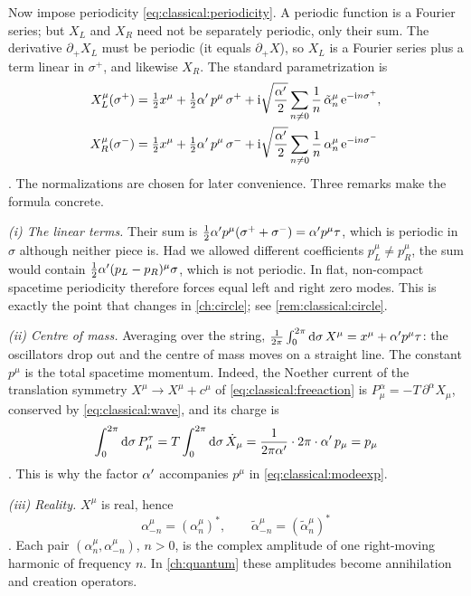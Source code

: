 Now impose periodicity \eqref{eq:classical:periodicity}. A periodic function is a Fourier
series; but $X_L$ and $X_R$ need not be separately periodic, only their sum. The derivative
$\partial_+X_L$ must be periodic (it equals $\partial_+X$), so $X_L$ is a Fourier series plus
a term linear in $\sigma^+$, and likewise $X_R$. The standard parametrization is
\begin{align}
  X_L^\mu(\sigma^+)&=\tfrac12x^\mu+\tfrac12\alpha'\,p^\mu\,\sigma^+
     +\mathrm{i}\sqrt{\frac{\alpha'}{2}}\sum_{n\neq0}\frac1n\,\tilde\alpha_n^\mu\,\mathrm{e}^{-\mathrm{i} n\sigma^+},\nonumber\\
  X_R^\mu(\sigma^-)&=\tfrac12x^\mu+\tfrac12\alpha'\,p^\mu\,\sigma^-
     +\mathrm{i}\sqrt{\frac{\alpha'}{2}}\sum_{n\neq0}\frac1n\,\alpha_n^\mu\,\mathrm{e}^{-\mathrm{i} n\sigma^-}
     \label{eq:classical:modeexp}
\end{align}
. The normalizations are chosen for
later convenience. Three remarks make the formula concrete.

\emph{(i) The linear terms.} Their sum is $\tfrac12\alpha' p^\mu(\sigma^++\sigma^-)=\alpha' p^\mu\tau$,
which is periodic in $\sigma$ although neither piece is. Had we allowed different
coefficients $p_L^\mu\neq p_R^\mu$, the sum would contain
$\tfrac12\alpha'(p_L-p_R)^\mu\sigma$, which is not periodic. In flat, non-compact spacetime
periodicity therefore forces equal left and right zero modes. This is exactly the point
that changes in \cref{ch:circle}; see \cref{rem:classical:circle}.

\emph{(ii) Centre of mass.} Averaging over the string,
$\frac{1}{2\pi}\int_0^{2\pi}\mathrm{d}\sigma\,X^\mu=x^\mu+\alpha' p^\mu\tau$: the oscillators drop out and
the centre of mass moves on a straight line. The constant $p^\mu$ is the total spacetime
momentum. Indeed, the Noether current of the translation symmetry $X^\mu\to X^\mu+c^\mu$ of
\eqref{eq:classical:freeaction} is $P^\alpha_\mu=-T\,\partial^\alpha X_\mu$, conserved by
\eqref{eq:classical:wave}, and its charge is
\begin{equation}\label{eq:classical:momentum}
  \int_0^{2\pi}\mathrm{d}\sigma\,P^\tau_\mu=T\int_0^{2\pi}\mathrm{d}\sigma\,\dot X_\mu
  =\frac{1}{2\pi\alpha'}\cdot2\pi\cdot\alpha'\,p_\mu=p_\mu
\end{equation}
. This is why the factor $\alpha'$ accompanies $p^\mu$ in
\eqref{eq:classical:modeexp}.

\emph{(iii) Reality.} $X^\mu$ is real, hence
\begin{equation}\label{eq:classical:reality}
  \alpha_{-n}^\mu=(\alpha_n^\mu)^\ast,\qquad \tilde\alpha_{-n}^\mu=(\tilde\alpha_n^\mu)^\ast
\end{equation}
. Each pair $(\alpha_n^\mu,\alpha_{-n}^\mu)$, $n>0$, is the
complex amplitude of one right-moving harmonic of frequency $n$. In \cref{ch:quantum} these
amplitudes become annihilation and creation operators.

